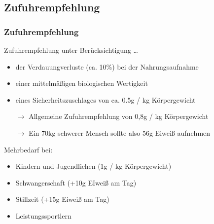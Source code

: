 \documentclass[xcolor=dvipsnames]{beamer}
\begin{document}
    \subsection{Zufuhrempfehlung}
    \begin{frame}
        \frametitle{Zufuhrempfehlung}

        \begin{block}{Zufuhrempfehlung unter Berücksichtigung \ldots}
            \begin{itemize}
                \setlength\itemsep{1em}
                \item der Verdauungverluste (ca. 10\%) bei der Nahrungsaufnahme
                \item einer mittelmäßigen biologischen Wertigkeit
                \item eines Sicherheitszuschlages von ca. 0.5g / kg Körpergewicht
                \item[$\rightarrow$] Allgemeine Zufuhrempfehlung von 0,8g / kg Körpergewicht
                \item[$\rightarrow$] Ein 70kg schwerer Mensch sollte also 56g Eiweiß aufnehmen
            \end{itemize}
        \end{block}
        Mehrbedarf bei:
        \begin{itemize}
            \item Kindern und Jugendlichen (1g / kg Körpergewicht)
            \item Schwangerschaft (+10g EIweiß am Tag)
            \item Stillzeit (+15g Eiweiß am Tag)
            \item Leistungssportlern
        \end{itemize}
    \end{frame}
\end{document}
